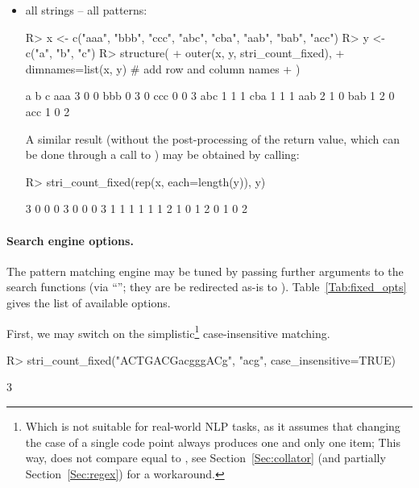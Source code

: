 \documentclass[nojss]{jss}
\begin{document}
\begin{itemize}
\item all strings -- all patterns:

\begin{Schunk}
\begin{Sinput}
R> x <- c("aaa", "bbb", "ccc", "abc", "cba", "aab", "bab", "acc")
R> y <- c("a", "b", "c")
R> structure(
+    outer(x, y, stri_count_fixed),
+    dimnames=list(x, y)  # add row and column names
+  )
\end{Sinput}
\begin{Soutput}
    a b c
aaa 3 0 0
bbb 0 3 0
ccc 0 0 3
abc 1 1 1
cba 1 1 1
aab 2 1 0
bab 1 2 0
acc 1 0 2
\end{Soutput}
\end{Schunk}

A similar result (without the post-processing of the return value,
which can be done through a call to )
may be obtained by calling:

\begin{Schunk}
\begin{Sinput}
R> stri_count_fixed(rep(x, each=length(y)), y)
\end{Sinput}
\begin{Soutput}
 [1] 3 0 0 0 3 0 0 0 3 1 1 1 1 1 1 2 1 0 1 2 0 1 0 2
\end{Soutput}
\end{Schunk}


\end{itemize}



\paragraph{Search engine options.}
The pattern matching engine may be tuned  by passing
further arguments to the search functions (via ``'';
they are be redirected as-is to ).
Table~\ref{Tab:fixed_opts} gives the list of available options.





First, we may switch on the simplistic\footnote{Which is not suitable
for real-world NLP tasks, as it assumes
that changing the case of a single code point always produces one and only
one item;
This way,  does not compare equal to ,
see Section~\ref{Sec:collator} (and partially Section~\ref{Sec:regex}) for a workaround.}
case-insensitive matching.


\begin{Schunk}
\begin{Sinput}
R> stri_count_fixed("ACTGACGacgggACg", "acg", case_insensitive=TRUE)
\end{Sinput}
\begin{Soutput}
[1] 3
\end{Soutput}
\end{Schunk}
\end{document}
